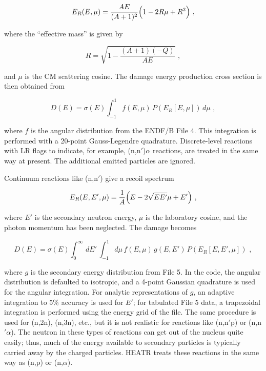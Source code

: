 \begin{equation}
   E_R(E,\mu)=\frac{AE}{(A+1)^2}\Bigl(1-2R\mu+R^2\Bigr)\,\,,
\label{tworec}
\end{equation}
\vspace{0.5 pt}

\noindent
where the ``effective mass'' is given by

\begin{equation}
   R=\sqrt{1-\frac{(A+1)(-Q)}{AE}}\,\,,
\end{equation}

\noindent
and $\mu$ is the CM scattering cosine.  The damage energy
production cross section is then obtained from

\begin{equation}
   D(E)=\sigma(E)\int_{-1}^1 f(E,\mu)\,
     P(E_R[E,\mu])\,d\mu\,\,,
\label{damint}
\end{equation}

\noindent
where $f$ is the angular distribution from the ENDF/B File 4.
This integration is performed with a 20-point Gauss-Legendre
quadrature.  Discrete-level reactions with LR flags to
indicate, for example, (n,n$'$)$\alpha$ reactions, are
treated in the same way at present.  The additional emitted
particles are ignored.

Continuum reactions like (n,n$'$) give a recoil spectrum

\begin{equation}
   E_R(E,E',\mu)=\frac{1}{A}\Bigl(E-2\sqrt{EE'}\mu+E'\Bigr)\,\,,
\end{equation}

\noindent
where $E'$ is the secondary neutron energy, $\mu$ is the
laboratory cosine, and the photon momentum has been neglected.
The damage becomes

\begin{equation}
   D(E)=\sigma(E)\int_0^\infty\,dE'\,\int_{-1}^1d\mu
     \, f(E,\mu)\,g(E,E')\,P(E_R[E,E',\mu])\,\,,
\label{f5dam}
\end{equation}

\noindent
where $g$ is the secondary energy distribution from File 5.
In the code, the angular distribution is defaulted to isotropic,
and a 4-point Gaussian quadrature is used for the angular
integration.  For analytic representations of $g$, an adaptive
integration to 5\% accuracy is used for $E'$; for tabulated
File 5 data, a trapezoidal integration is performed using the
energy grid of the file.  The same procedure is used for
(n,2n), (n,3n), etc., but it is not realistic for reactions
like (n,n$'$p) or (n,n$'\alpha$).  The neutron in these types of
reactions can get out of the nucleus quite easily; thus, much of
the energy available to secondary particles is typically carried
away by the charged particles\cite{alb}.  HEATR treats these
reactions in the same way as (n,p) or (n,$\alpha$).

